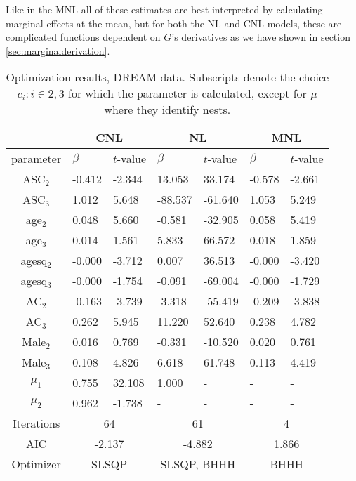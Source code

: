 Like in the MNL all of these estimates are best interpreted by calculating marginal effects at the mean, but for both the NL and CNL models, these are complicated functions dependent on $G$'s derivatives as we have shown in section \ref{sec:marginalderivation}.

\begin{table}
  \centering
  \footnotesize
\begin{tabular}{c|ll|ll|ll}
  \toprule
           & \multicolumn{2}{c}{CNL}    & \multicolumn{2}{c}{NL}      & \multicolumn{2}{c}{MNL}                \\ \hline
     parameter &      $\beta$ &        $t$-value &       $\beta$ &         $t$-value &         $\beta$ &           $t$-value \\
\midrule
ASC$_2$      &    -0.412 &  -2.344 &   13.053 &  33.174 & -0.578 & -2.661 \\
ASC$_3$      &     1.012 &   5.648 &  -88.537 & -61.640 &  1.053 &  5.249 \\
age$_2$      &     0.048 &   5.660 &   -0.581 & -32.905 &  0.058 &  5.419 \\
age$_3$      &     0.014 &   1.561 &    5.833 &  66.572 &  0.018 &  1.859 \\
agesq$_2$    &    -0.000 &  -3.712 &    0.007 &  36.513 & -0.000 & -3.420 \\
agesq$_3$     &    -0.000 &  -1.754 &   -0.091 & -69.004 & -0.000 & -1.729 \\
AC$_2$       &    -0.163 &  -3.739 &   -3.318 & -55.419 & -0.209 & -3.838 \\
AC$_3$       &     0.262 &   5.945 &   11.220 &  52.640 &  0.238 &  4.782 \\
Male$_2$     &     0.016 &   0.769 &   -0.331 & -10.520 &  0.020 &  0.761 \\
Male$_3$     &     0.108 &   4.826 &    6.618 &  61.748 &  0.113 &  4.419 \\
$\mu_1$       &     0.755 &  32.108 &    1.000 &     - &    - &    - \\
$\mu_2$       &     0.962 &  -1.738 &      - &     - &    - &    - \\ \hline
Iterations & \multicolumn{2}{c}{64}      & \multicolumn{2}{c}{61}      & \multicolumn{2}{c}{4}                \\
AIC & \multicolumn{2}{c}{-2.137}      & \multicolumn{2}{c}{-4.882}      & \multicolumn{2}{c}{1.866}                \\
Optimizer  & \multicolumn{2}{c}{SLSQP}   & \multicolumn{2}{c}{SLSQP, BHHH}   & \multicolumn{2}{c}{BHHH} \\
\bottomrule
\end{tabular}
\caption[Optimization results]{Optimization results, DREAM data. Subscripts denote the choice  $c_i : i \in2,3$ for which the parameter is calculated, except for $\mu$ where they identify nests.}
\label{tab: results}
\end{table}

